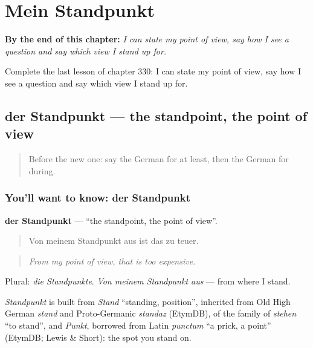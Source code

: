 
\chapter{Mein Standpunkt}
\label{ch:ge-mein-standpunkt}

\begin{chapteropening}
\textbf{By the end of this chapter:} \emph{I can state my point of view, say how I see a question and say which view I stand up for.}

Complete the last lesson of chapter 330: I can state my point of view, say how I see a question and say which view I stand up for.
\end{chapteropening}

\section[der Standpunkt]{der Standpunkt — the standpoint, the point of view}

\label{lesson:GE-C330-standpunkt}



\begin{quote}
Before the new one: say the German for at least, then the German for during.
\end{quote}

\subsection*{You'll want to know: der Standpunkt}
\textbf{der Standpunkt} — \textquotedblleft{}the standpoint, the point of view\textquotedblright{}.

\begin{quote}
Von meinem Standpunkt aus ist das zu teuer.
\end{quote}

\begin{quote}
\emph{From my point of view, that is too expensive.}
\end{quote}

Plural: \emph{die Standpunkte}. \emph{Von meinem Standpunkt aus} — from where I stand.

\begin{cousinweb}
\emph{Standpunkt} is built from \emph{Stand} \textquotedblleft{}standing, position\textquotedblright{}, inherited from Old High German \emph{stand} and Proto-Germanic \emph{standaz} (EtymDB), of the family of \emph{stehen} \textquotedblleft{}to stand\textquotedblright{}, and \emph{Punkt}, borrowed from Latin \emph{punctum} \textquotedblleft{}a prick, a point\textquotedblright{} (EtymDB; Lewis \& Short): the spot you stand on.
\end{cousinweb}


